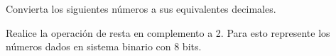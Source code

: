\documentclass[addpoints]{exam}
\begin{document}
\begin{questions}

\question Convierta los siguientes números a sus equivalentes decimales.

\droptotalpoints %





\question Realice la operación de resta en complemento a 2. Para esto
represente los números dados en sistema binario con 8 bits.

\end{questions}
\end{document}
